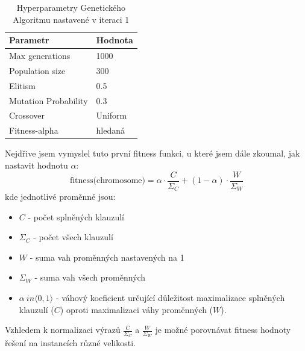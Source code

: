 \documentclass[12pt]{article}
\begin{document}
\begin{table}[h!]
\centering
\caption{Hyperparametry Genetického Algoritmu nastavené v iteraci 1}
\begin{tabular}{@{}ll@{}}
\toprule
\textbf{Parametr}        & \textbf{Hodnota}       \\ \midrule
Max generations           & 1000                \\
Population size           & 300                 \\
Elitism                   & 0.5                 \\
Mutation Probability      & 0.3                 \\
Crossover                 & Uniform             \\
Fitness-alpha             & hledaná                 \\ \bottomrule
\end{tabular}
\label{tab:ga_parameters}
\end{table}

Nejdřive jsem vymyslel tuto první fitness funkci, u které jsem dále zkoumal, jak nastavit hodnotu $\alpha$:
\[
\text{fitness(chromosome)} = \alpha \cdot \frac{C}{\Sigma_C} + (1-\alpha) \cdot \frac{W}{\Sigma_W}
\]
kde jednotlivé proměnné jsou:
\begin{itemize}
    \item $C$ - počet splněných klauzulí
    \item $\Sigma_C$ - počet všech klauzulí
    \item $W$ - suma vah proměnných nastavených na 1
    \item $\Sigma_W$ - suma vah všech proměnných
    \item $\alpha \ in \langle 0, 1 \rangle$ - váhový koeficient určující důležitost maximalizace splněných klauzulí ($C$) oproti maximalizaci váhy proměnných ($W$).
\end{itemize}
Vzhledem k normalizaci výrazů $\frac{C}{\Sigma_C}$ a $\frac{W}{\Sigma_W}$ je možné porovnávat fitness hodnoty řešení na instancích různé velikosti. 
\end{document}
